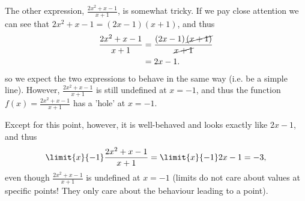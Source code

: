 \begin{enumerate}
{\begin{answer}
							The other expression, $\frac{2x^{2}+x-1}{x+1}$, is somewhat tricky. If we pay close attention we can see that $2x^{2}+x-1=\left( 2x-1 \right)\left( x+1 \right)$, and thus
							\begin{align*}
								\frac{2x^{2}+x-1}{x+1} &= \frac{\left( 2x-1 \right)\cancel{\left( x+1 \right)}}{\cancel{x+1}}\\
								&= 2x-1.
							\end{align*}
							so we expect the two expressions to behave in the same way (i.e. be a simple line). However, $\frac{2x^{2}+x-1}{x+1}$ is still undefined at $x=-1$, and thus the function $f\left( x \right)=\frac{2x^{2}+x-1}{x+1}$ has a 'hole' at $x=-1$.

							Except for this point, however, it is well-behaved and looks exactly like $2x-1$, and thus 
							\begin{equation*}
								\limit{x}{ -1}\frac{2x^{2}+x-1}{x+1}=\limit{x}{ -1}2x-1=-3,
							\end{equation*}
							even though $\frac{2x^{2}+x-1}{x+1}$ is undefined at $x=-1$ (limits do not care about values at specific points! They only care about the behaviour leading to a point).
						\end{answer}
					}\fi


\end{enumerate}
